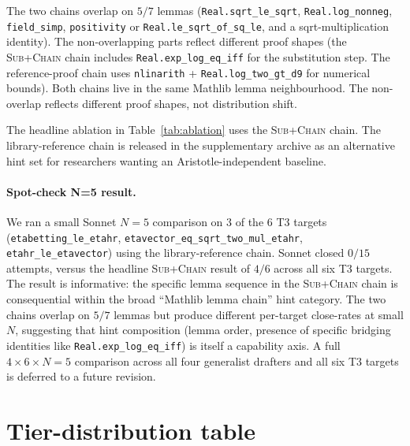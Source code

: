 The two chains overlap on $5/7$ lemmas
(\texttt{Real.sqrt\_le\_sqrt}, \texttt{Real.log\_nonneg},
\texttt{field\_simp}, \texttt{positivity} or
\texttt{Real.le\_sqrt\_of\_sq\_le}, and a sqrt-multiplication
identity). The non-overlapping
parts reflect different proof shapes (the \textsc{Sub+Chain} chain
includes \texttt{Real.exp\_log\_eq\_iff} for the substitution
step. The reference-proof chain uses \texttt{nlinarith} +
\texttt{Real.log\_two\_gt\_d9} for numerical bounds). Both
chains live in the same Mathlib lemma neighbourhood. The
non-overlap reflects different proof shapes, not distribution
shift.

The headline ablation in Table~\ref{tab:ablation} uses the
\textsc{Sub+Chain} chain. The library-reference chain is released in
the supplementary archive as an alternative hint set for
researchers wanting an Aristotle-independent baseline.

\paragraph{Spot-check N=5 result.}
We ran a small Sonnet $N=5$ comparison on $3$ of the $6$ T3
targets (\texttt{etabetting\_le\_etahr},
\texttt{etavector\_eq\_sqrt\_two\_mul\_etahr},
\texttt{etahr\_le\_etavector}) using the library-reference
chain. Sonnet closed $0/15$ attempts, versus the headline \textsc{Sub+Chain}
result of $4/6$ across all six T3 targets. The result is
informative: the specific lemma sequence in the \textsc{Sub+Chain} chain
is consequential within the broad ``Mathlib lemma chain'' hint
category. The two chains overlap on $5/7$ lemmas but produce
different per-target close-rates at small $N$, suggesting
that hint composition (lemma order, presence of specific bridging
identities like \texttt{Real.exp\_log\_eq\_iff}) is itself a
capability axis. A full $4 \times 6 \times N=5$ comparison
across all four generalist drafters and all six T3 targets is
deferred to a future revision.

\section{Tier-distribution table}
\label{app:tier-dist}

